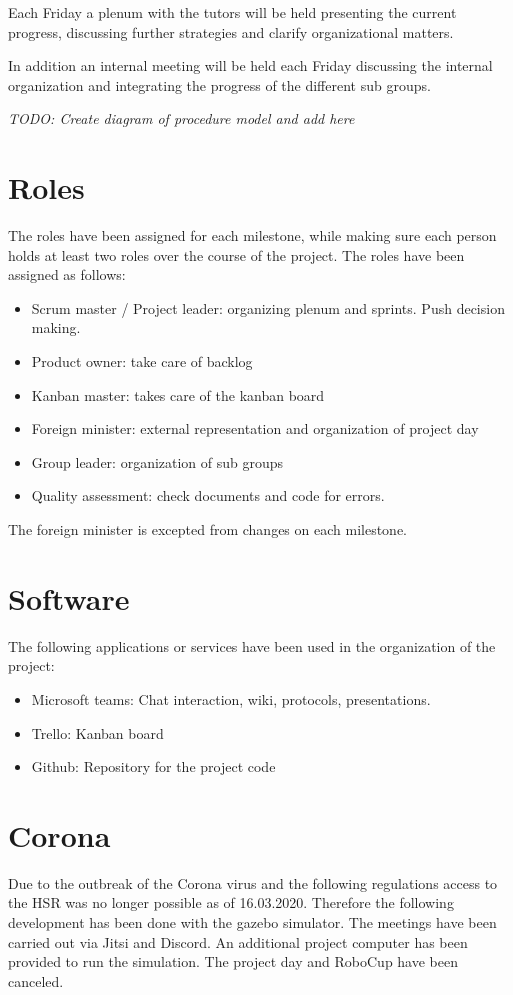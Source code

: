 \documentclass[main.tex]{subfiles}
\begin{document}
	Each Friday a plenum with the tutors will be held presenting the current progress, discussing further strategies and clarify organizational matters.
	
	In addition an internal meeting will be held each Friday discussing the internal organization and integrating the progress of the different sub groups.
	
	\textit{TODO: Create diagram of procedure model and add here}

	\section{Roles}
	The roles have been assigned for each milestone, while making sure each person holds at least two roles over the course of the project. The roles have been assigned as follows:
	\begin{itemize}
		\item Scrum master / Project leader: organizing plenum and sprints. Push decision making.
		\item Product owner: take care of backlog
		\item Kanban master: takes care of the kanban board
		\item Foreign minister: external representation and organization of project day
		\item Group leader: organization of sub groups
		\item Quality assessment: check documents and code for errors.
	\end{itemize}

	The foreign minister is excepted from changes on each milestone.
	
	\section{Software}
	The following applications or services have been used in the organization of the project:
	\begin{itemize}
		\item Microsoft teams: Chat interaction, wiki, protocols, presentations.
		\item Trello: Kanban board
		\item Github: Repository for the project code
	\end{itemize}  

	\section{Corona}
	Due to the outbreak of the Corona virus and the following regulations access to the HSR was no longer possible as of 16.03.2020. Therefore the following development has been done with the gazebo simulator.
	The meetings have been carried out via Jitsi and Discord. An additional project computer has been provided to run the simulation.
	The project day and RoboCup have been canceled.
	
\end{document}
